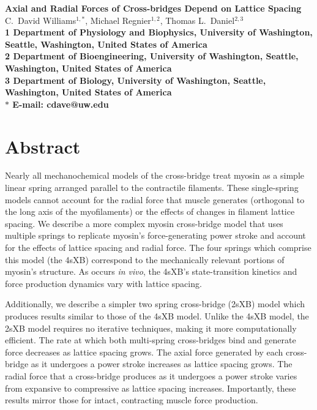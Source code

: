 \documentclass[10pt]{article}
\date{}
\begin{document}
\begin{flushleft}
{\Large
\textbf{Axial and Radial Forces of Cross-bridges Depend on Lattice Spacing}
}
\\
C.\ David Williams$^{1,\ast}$, 
Michael Regnier$^{1,2}$, 
Thomas L.\ Daniel$^{2,3}$
\\
\bf{1} Department of Physiology and Biophysics, University of Washington, Seattle, Washington, United States of America
\\
\bf{2} Department of Bioengineering, University of Washington, Seattle, Washington, United States of America
\\
\bf{3} Department of Biology, University of Washington, Seattle, Washington, United States of America
\\
$\ast$ E-mail: cdave@uw.edu
\end{flushleft}

\section*{Abstract} %
Nearly all mechanochemical models of the cross-bridge treat myosin as a simple linear spring arranged parallel to the contractile filaments.
These single-spring models cannot account for the radial force that muscle generates (orthogonal to the long axis of the myofilaments) or the effects of changes in filament lattice spacing. 
We describe a more complex myosin cross-bridge model that uses multiple springs to replicate myosin's force-generating power stroke and account for the effects of lattice spacing and radial force. 
The four springs which comprise this model (the 4sXB) correspond to the mechanically relevant portions of myosin's structure.
As occurs \emph{in vivo}, the 4sXB's state-transition kinetics and force production dynamics vary with lattice spacing.

Additionally, we describe a simpler two spring cross-bridge (2sXB) model which produces results similar to those of the 4sXB model.
Unlike the 4sXB model, the 2sXB model requires no iterative techniques, making it more computationally efficient.
The rate at which both multi-spring cross-bridges bind and generate force decreases as lattice spacing grows. 
The axial force generated by each cross-bridge as it undergoes a power stroke increases as lattice spacing grows.
The radial force that a cross-bridge produces as it undergoes a power stroke varies from expansive to compressive as lattice spacing increases.
Importantly, these results mirror those for intact, contracting muscle force production.
\end{document}
